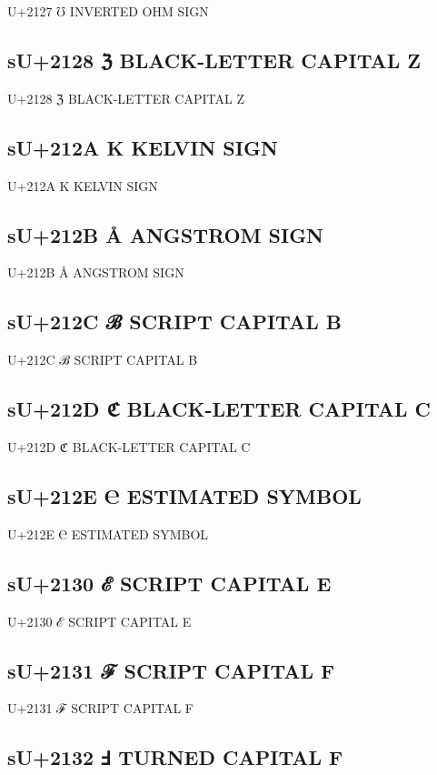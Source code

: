 U+2127 ℧  INVERTED OHM SIGN

\subsection{sU+2128 ℨ BLACK-LETTER CAPITAL Z}

U+2128 ℨ BLACK-LETTER CAPITAL Z

\subsection{sU+212A K KELVIN SIGN}

U+212A K KELVIN SIGN

\subsection{sU+212B Å ANGSTROM SIGN}

U+212B Å ANGSTROM SIGN

\subsection{sU+212C ℬ SCRIPT CAPITAL B}

U+212C ℬ SCRIPT CAPITAL B

\subsection{sU+212D ℭ BLACK-LETTER CAPITAL C}

U+212D ℭ BLACK-LETTER CAPITAL C

\subsection{sU+212E ℮  ESTIMATED SYMBOL}

U+212E ℮  ESTIMATED SYMBOL

\subsection{sU+2130 ℰ SCRIPT CAPITAL E}

U+2130 ℰ SCRIPT CAPITAL E

\subsection{sU+2131 ℱ SCRIPT CAPITAL F}

U+2131 ℱ SCRIPT CAPITAL F

\subsection{sU+2132 Ⅎ TURNED CAPITAL F}

